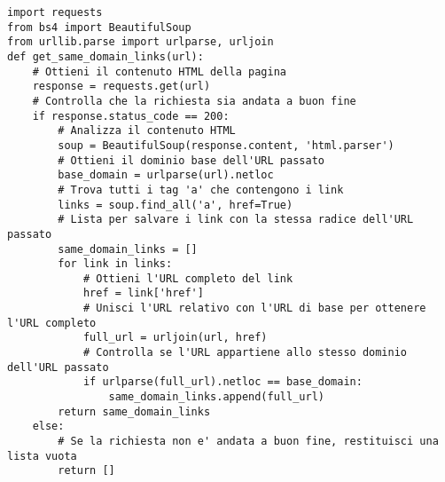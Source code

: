 \begin{lstlisting}[style=pythonstyle,caption={Codice del url\_parser.py}, label={lst:urlparser}]
import requests
from bs4 import BeautifulSoup
from urllib.parse import urlparse, urljoin
def get_same_domain_links(url):
    # Ottieni il contenuto HTML della pagina
    response = requests.get(url)
    # Controlla che la richiesta sia andata a buon fine
    if response.status_code == 200:
        # Analizza il contenuto HTML
        soup = BeautifulSoup(response.content, 'html.parser')
        # Ottieni il dominio base dell'URL passato
        base_domain = urlparse(url).netloc
        # Trova tutti i tag 'a' che contengono i link
        links = soup.find_all('a', href=True)
        # Lista per salvare i link con la stessa radice dell'URL passato
        same_domain_links = []
        for link in links:
            # Ottieni l'URL completo del link
            href = link['href']
            # Unisci l'URL relativo con l'URL di base per ottenere l'URL completo
            full_url = urljoin(url, href)
            # Controlla se l'URL appartiene allo stesso dominio dell'URL passato
            if urlparse(full_url).netloc == base_domain:
                same_domain_links.append(full_url)
        return same_domain_links
    else:
        # Se la richiesta non e' andata a buon fine, restituisci una lista vuota
        return []
\end{lstlisting}
